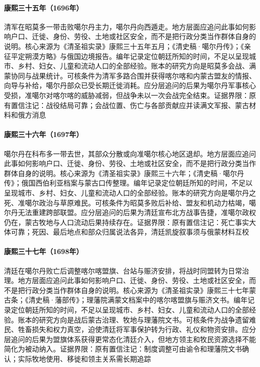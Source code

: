 \hypertarget{social:EQ-1696-JAOMODO}{}\paragraph{康熙三十五年（1696年）}清军在昭莫多一带击败噶尔丹主力，噶尔丹向西遁走。地方层面应追问此事如何影响户口、迁徙、身份、劳役、土地或社区安全，而不是把行政分类当作群体自身的说明。核心来源为《清圣祖实录》康熙三十五年五月；《清史稿·噶尔丹传》；《亲征平定朔漠方略》与俄国边境报告。编年记录定位朝廷所知的时间，不足以呈现城市、乡村、妇女、儿童和流动人口的全部经验。账本的研究方向是昭莫多会战、满蒙协同与战果统计。可核条件为清军多路合围并获得喀尔喀和内蒙古盟友的情报、向导与补给，噶尔丹部众已受长期迁徙消耗。应分层追问的后果为噶尔丹军事核心受损，准噶尔对喀尔喀的威胁减弱，但战争未以一次会战完全结束。证据界限：原有置信注记：战役结局可靠；会战位置、伤亡与各部贡献应并读满文军报、蒙古材料和俄方消息
\hypertarget{social:EQ-1697-GALDAN-DEATH}{}\paragraph{康熙三十六年（1697年）}噶尔丹在科布多一带去世，其部众分散或向准噶尔核心地区退却。地方层面应追问此事如何影响户口、迁徙、身份、劳役、土地或社区安全，而不是把行政分类当作群体自身的说明。核心来源为《清圣祖实录》康熙三十六年；《清史稿·噶尔丹传》；俄国西伯利亚档案与蒙古口传整理。编年记录定位朝廷所知的时间，不足以呈现城市、乡村、妇女、儿童和流动人口的全部经验。账本的研究方向是噶尔丹之死、准噶尔政治与草原难民。可核条件为昭莫多败后补给、盟友和机动力枯竭，噶尔丹无法重建跨部联盟。应分层追问的后果为清廷宣布北方战事告捷，准噶尔政权仍在，蒙古牧地与人口流动后果持续存在。证据界限：原有置信注记：死亡事实大体可靠；死因、最后地点和部众归属说法各异，清廷凯旋叙事须与俄蒙材料互校
\hypertarget{social:EQ-1698-KHALKHA-ADMINISTRATION}{}\paragraph{康熙三十七年（1698年）}清廷在噶尔丹败亡后调整喀尔喀盟旗、台站与赈济安排，将战时同盟转为日常治理。地方层面应追问此事如何影响户口、迁徙、身份、劳役、土地或社区安全，而不是把行政分类当作群体自身的说明。核心来源为《清圣祖实录》康熙三十七年蒙古条；《清史稿·藩部传》；理藩院满蒙文档案中的喀尔喀盟旗与赈济文书。编年记录定位朝廷所知的时间，不足以呈现城市、乡村、妇女、儿童和流动人口的全部经验。账本的研究方向是战后蒙古治理、牧地与理藩院文书。可核条件为战争遗留难民、牲畜损失和权力真空，迫使清廷将军事保护转为行政、礼仪和物资安排。应分层追问的后果为盟旗体系获得更常态化清廷介入，但地方领主和牧民资源选择不能简化为被动纳入。证据界限：原有置信注记：制度调整可由谕令和理藩院文书确认；实际牧地使用、移徙和领主关系需长期追踪
